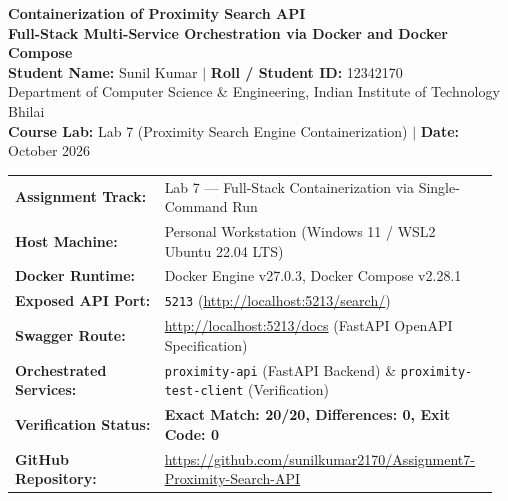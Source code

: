 \documentclass[11pt,a4paper]{article}
\begin{document}
\begin{center}
    {\LARGE \bfseries \color{primarycolor} Containerization of Proximity Search API}\\[0.2cm]
    {\large \bfseries Full-Stack Multi-Service Orchestration via Docker and Docker Compose}\\[0.3cm]
    {\large \textbf{Student Name:} Sunil Kumar \quad $|$ \quad \textbf{Roll / Student ID:} 12342170}\\[0.1cm]
    {\normalsize Department of Computer Science \& Engineering, Indian Institute of Technology Bhilai}\\[0.1cm]
    {\small \textbf{Course Lab:} Lab 7 (Proximity Search Engine Containerization) \quad $|$ \quad \textbf{Date:} October 2026}
\end{center}

\begin{tcolorbox}[colback=boxbg, colframe=primarycolor, boxrule=0.8pt, arc=3pt,
                  title={\bfseries Project Metadata \& Deployment Environment}, fonttitle=\small, left=6pt, right=6pt, top=3pt, bottom=3pt]
\small
\begin{tabular}{@{}p{0.30\linewidth}p{0.66\linewidth}@{}}
\textbf{Assignment Track:} & Lab 7 — Full-Stack Containerization via Single-Command Run \\[2pt]
\textbf{Host Machine:} & Personal Workstation (Windows 11 / WSL2 Ubuntu 22.04 LTS) \\[2pt]
\textbf{Docker Runtime:} & Docker Engine v27.0.3, Docker Compose v2.28.1 \\[2pt]
\textbf{Exposed API Port:} & \texttt{5213} (\url{http://localhost:5213/search/}) \\[2pt]
\textbf{Swagger Route:} & \url{http://localhost:5213/docs} (FastAPI OpenAPI Specification) \\[2pt]
\textbf{Orchestrated Services:} & \texttt{proximity-api} (FastAPI Backend) \& \texttt{proximity-test-client} (Verification) \\[2pt]
\textbf{Verification Status:} & \textcolor{codegreen}{\textbf{Exact Match: 20/20, Differences: 0, Exit Code: 0}} \\[2pt]
\textbf{GitHub Repository:} & \url{https://github.com/sunilkumar2170/Assignment7-Proximity-Search-API} \\
\end{tabular}
\end{tcolorbox}
\end{document}
